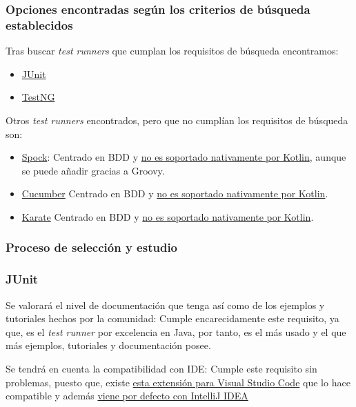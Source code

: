 \subsubsection{Opciones encontradas según los criterios de búsqueda establecidos}

Tras buscar \emph{test runners} que cumplan los requisitos de búsqueda encontramos:

\begin{itemize}
    \item \href{https://junit.org/junit5/}{JUnit}
    \item \href{https://testng.org/doc/index.html}{TestNG}
\end{itemize}

Otros \emph{test runners} encontrados, pero que no cumplían los requisitos de búsqueda son:
\begin{itemize}
    \item \href{https://spockframework.org/}{Spock}: Centrado en BDD y \href{https://kotlinlang.org/api/latest/kotlin.test/}{no es soportado nativamente por Kotlin}, aunque se puede añadir gracias a Groovy.
    \item \href{https://cucumber.io/}{Cucumber} Centrado en BDD y \href{https://kotlinlang.org/api/latest/kotlin.test/}{no es soportado nativamente por Kotlin}.
    \item \href{https://github.com/karatelabs/karate}{Karate} Centrado en BDD y \href{https://kotlinlang.org/api/latest/kotlin.test/}{no es soportado nativamente por Kotlin}.
\end{itemize}


\subsubsection{Proceso de selección y estudio}

\subsubsection{JUnit}

\begin{todolist}
    \item[\xcmark] Se valorará el nivel de documentación que tenga así como de
    los ejemplos y tutoriales hechos por la comunidad: Cumple encarecidamente
    este requisito, ya que, es el \emph{test runner} por excelencia en Java, por
    tanto, es el más usado y el que más ejemplos, tutoriales y documentación
    posee.
    \item[\xcmark] Se tendrá en cuenta la compatibilidad con IDE: Cumple este
    requisito sin problemas, puesto que, existe
    \href{https://code.visualstudio.com/docs/java/java-testing}{esta extensión para
    Visual Studio Code} que lo hace compatible y además
    \href{https://www.jetbrains.com/help/idea/junit.html}{viene por defecto con
    IntelliJ IDEA}
\end{todolist}



